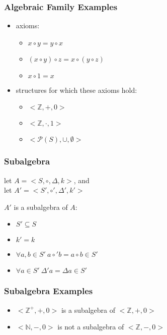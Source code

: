 \documentclass[dvipsnames]{beamer}
\begin{document}
\begin{frame}
  \frametitle{Algebraic Family Examples}

  \begin{example}
    \begin{itemize}
      \item axioms:
      \begin{itemize}
        \item $x \circ y = y \circ x$
        \item $(x \circ y) \circ z = x \circ (y \circ z)$
        \item $x \circ 1 = x$
      \end{itemize}

      \pause
      \item structures for which these axioms hold:
      \begin{itemize}
       \item $<\mathbb{Z},+,0>$
       \item $<\mathbb{Z},\cdot,1>$
       \item $<\mathcal{P}(S),\cup,\emptyset>$
      \end{itemize}
    \end{itemize}
  \end{example}
\end{frame}

\begin{frame}
  \frametitle{Subalgebra}

  \begin{definition}
    let $A = <S,\circ,\Delta,k>$, and\\
    let $A' = <S',\circ',\Delta',k'>$

    \medskip
    $A'$ is a \alert{subalgebra} of $A$:

    \pause
    \medskip
    \begin{itemize}
      \item $S' \subseteq S$
      \item $k' = k$
      \item $\forall a,b \in S'~a \circ' b = a \circ b \in S'$
      \item $\forall a \in S'~\Delta' a = \Delta a \in S'$
    \end{itemize}
  \end{definition}
\end{frame}

\begin{frame}
  \frametitle{Subalgebra Examples}

  \begin{example}
    \begin{itemize}
      \item $<\mathbb{Z}^+,+,0>$ is a subalgebra of $<\mathbb{Z},+,0>$
      \pause
      \item $<\mathbb{N},-,0>$ is not a subalgebra of $<\mathbb{Z},-,0>$
    \end{itemize}
  \end{example}
\end{frame}
\end{document}
